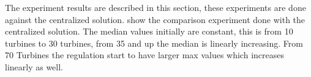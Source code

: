 The  experiment results are described in this section, these experiments are done against the centralized solution.  show the comparison experiment done with the centralized solution. The median values initially are constant, this is from 10 turbines to 30 turbines, from 35 and up the median is linearly increasing.
From 70 Turbines the regulation start to have larger max values which increases linearly as well.








